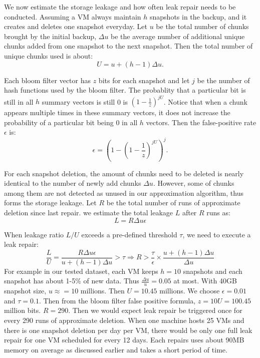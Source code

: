 We now estimate the storage leakage and how often leak repair needs to be conducted.
Assuming a VM always maintain $h$ snapshots in the backup, and it creates and deletes one snapshot
everyday. Let $u$ be the total number of chunks brought by the initial backup, $\Delta u$ be the average
number of additional unique chunks added from one snapshot to the next snapshot. Then the total number of unique
chunks used is about:
\[
U = u + (h-1)\Delta u.
\]

Each bloom filter vector has  $z$ bits for each snapshot and let $j$ be the number of hash functions used by the
bloom filter. The probablity that a particular bit is still in all $h$ summary vectors is still 0 is 
$(1- \frac{1}{z}) ^{j U}$. Notice that when a chunk appears multiple times in these summary vectors, it does not 
increase the probability of a particular bit being 0 in all $h$ vectors.
Then the false-positive rate $\epsilon$ is: 
\[
\epsilon = (1-(1-\frac{1}{z})^{jU})^j.
\]

For each snapshot deletion, the amount of chunks need to be deleted is nearly identical to the number of
newly add chunks $\Delta u$. However, some of chunks among them are not detected as unused in our approximation
algorithm, thus forms the storage leakage. Let $R$ be the total number of runs of approximate deletion since
last repair. we estimate  the total leakage $L$ after $R$ runs as:
\[
L = R \Delta u \epsilon
\]

When leakage ratio $L/U$ exceeds a pre-defined threshold $\tau$, we need to execute a leak repair:
\[
\frac{L}{U} = \frac{R \Delta u \epsilon}{u+(h-1)\Delta u } > \tau 
\Longrightarrow R > \frac{\tau}{\epsilon}\times\frac{u + (h-1)\Delta u}{\Delta u}
\]
For example in our tested dataset,  
each VM keeps $h=10$ snapshots and each snapshot has
about 1-5\% of new data. Thus $\frac{\Delta u}{u}=0.05$ at most. With 40GB snapshot size, $u\approx = 10$ millions.
Then $U=10.45$ millions.
We choose  $\epsilon = 0.01$ and $\tau=0.1$. Then from the bloom filter  false positive formula, 
$z=10U=100.45$ million bits. $R=290$.
Then we would expect leak repair be triggered once for 
every 290 runs of approximate deletion. 
When one machine hosts 25 VMs and there is one snapshot deletion per day per VM, there would be 
only one full leak repair for one VM scheduled for every 12 days. Each repairs uses about 90MB memory on average
as discussed earlier and takes a short period of time.
